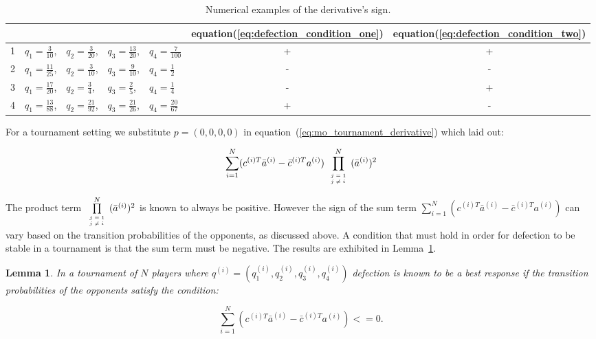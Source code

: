 \documentclass[10pt]{article}
\newtheorem{lemma}[theorem]{Lemma}
\begin{document}
\begin{table}[htbp]
\begin{center}
\begin{tabular}{cllllcc}
    \toprule
    {}& {} & {}& {}& {}&  equation(\ref{eq:defection_condition_one}) &  equation(\ref{eq:defection_condition_two}) \\
    \midrule
1 & \(q_1=\frac{3}{10}\),   & \(q_2=\frac{3}{20}\),  & \(q_3=\frac{13}{20}\), & \(q_4=\frac{7}{100}\)
&  + & + \\
2 & \(q_1=\frac{11}{25}\),  & \(q_2=\frac{3}{10}\),  & \(q_3=\frac{9}{10}\),  & \(q_4=\frac{1}{2}\)
&  - & - \\
3 & \(q_1=\frac{17}{20}\),  & \(q_2=\frac{3}{4}\),   & \(q_3=\frac{2}{5}\),   & \(q_4=\frac{1}{4}\)
&  - & + \\
4 & \(q_1=\frac{13}{88}\),  & \(q_2=\frac{21}{92}\),  & \(q_3=\frac{21}{26}\),  & \(q_4=\frac{20}{67}\)
&  + & - \\
    \bottomrule
\end{tabular}
\end{center}
\caption{Numerical examples of the derivative's sign.}
\label{table:sign_of_derivative}
\end{table}

For a tournament setting we substitute \(p = (0, 0, 0, 0)\) in
equation~(\ref{eq:mo_tournament_derivative}) which laid out:

\begin{equation}
\sum_{i=1} ^ N (c^{(i)T} \bar{a}^{(i)} - \bar{c}^{(i)T} a^{(i)})
\prod\limits_{\tiny\begin{array}{l} j=1 \\ j \neq i \end{array}} ^ N (\bar{a}^{(i)})^2
\end{equation}

The product term \(\prod\limits_{\tiny\begin{array}{l} j=1 \\ j \neq i \end{array}} ^ N (\bar{a}^{(i)})^2\)
is known to always be positive. However the sign of the sum term
\(\sum_{i=1} ^ N (c^{(i)T} \bar{a}^{(i)} - \bar{c}^{(i)T} a^{(i)})\) can vary based
on the transition probabilities of the opponents, as discussed above. A condition that
must hold in order for defection to be stable in a tournament is that the sum term
must be negative. The results are exhibited in Lemma~\ref{lemma:stability_of_defection}.

\begin{lemma}\label{lemma:stability_of_defection}
    In a tournament of \(N\) players where \(q^{(i)} = (q_{1}^{(i)}, q_{2}^{(i)}, q_{3}^{(i)}, q_{4}^{(i)})\)
    defection is known to be a best response if the transition probabilities of the
    opponents satisfy the condition:

    \begin{equation}
        \sum_{i=1} ^ N (c^{(i)T} \bar{a}^{(i)} - \bar{c}^{(i)T} a^{(i)}) <= 0.
    \end{equation}
\end{lemma}
\end{document}
